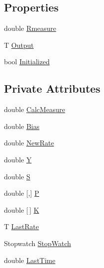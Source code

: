 \subsection*{Properties}
\begin{DoxyCompactItemize}
\item 
double \hyperlink{class_robotics_library_1_1_filters_1_1_kalman_abb21b31283beac465da9fe1c947a52cf}{Rmeasure}
\item 
T \hyperlink{class_robotics_library_1_1_filters_1_1_kalman_af2e026fe76f5a30e8da58dcc654ec26d}{Output}
\item 
bool \hyperlink{class_robotics_library_1_1_filters_1_1_kalman_a3c9aa0e2650a8085161821e858e64bb9}{Initialized}
\end{DoxyCompactItemize}
\subsection*{Private Attributes}
\begin{DoxyCompactItemize}
\item 
double \hyperlink{class_robotics_library_1_1_filters_1_1_kalman_a6af091d7f8b91835dfc8d4249de67db9}{Calc\+Measure}
\item 
double \hyperlink{class_robotics_library_1_1_filters_1_1_kalman_a9ab33a9815f641e2867562bc87c4903b}{Bias}
\item 
double \hyperlink{class_robotics_library_1_1_filters_1_1_kalman_a3460c72ca1559167bdc75b15af62f02d}{New\+Rate}
\item 
double \hyperlink{class_robotics_library_1_1_filters_1_1_kalman_aa64729ed425d53ec193cce9eb533bdc5}{Y}
\item 
double \hyperlink{class_robotics_library_1_1_filters_1_1_kalman_a66d8ab98513fe6152b81ad8cb5019240}{S}
\item 
double \mbox{[},\mbox{]} \hyperlink{class_robotics_library_1_1_filters_1_1_kalman_aeebdcb0526a88f010d3f703b137da9b8}{P}
\item 
double \mbox{[}$\,$\mbox{]} \hyperlink{class_robotics_library_1_1_filters_1_1_kalman_acfc2b088052cf66ad450dadac5a447dc}{K}
\item 
T \hyperlink{class_robotics_library_1_1_filters_1_1_kalman_a87b556d80535f21c00bf1dd7235c5953}{Last\+Rate}
\item 
Stopwatch \hyperlink{class_robotics_library_1_1_filters_1_1_kalman_a849c2e4310b17b9fe3d63d14fc29b325}{Stop\+Watch}
\item 
double \hyperlink{class_robotics_library_1_1_filters_1_1_kalman_a0ef91e55c642e8c6b69093ab955f4b5e}{Last\+Time}
\end{DoxyCompactItemize}


